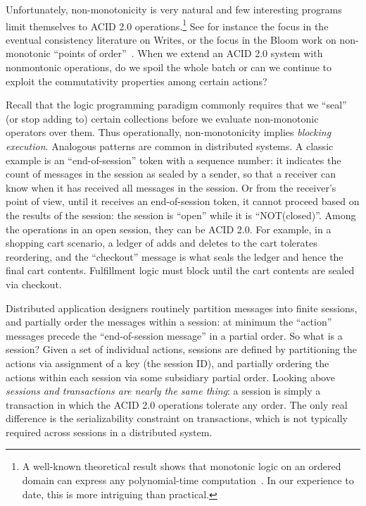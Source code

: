 \documentclass{sig-alternate}
\begin{document}
Unfortunately, non-monotonicity is very natural and few interesting programs
limit themselves to ACID 2.0 operations.\footnote{A well-known theoretical
  result shows that monotonic logic on an ordered domain can express any
  polynomial-time computation~\cite{immerman-ptime}.  In our experience to date,
  this is more intriguing than practical.}  See for instance the focus in the
eventual consistency literature on Writes, or the focus in the Bloom work on
non-monotonic ``points of order''~\cite{Alvaro2011}.  When we extend an ACID 2.0
system with nonmontonic operations, do we spoil the whole batch or can we
continue to exploit the commutativity properties among certain actions?


Recall that the logic programming paradigm commonly requires that we
``seal'' (or stop adding to) certain collections before we evaluate non-monotonic operators
over them.
Thus operationally, non-monotonicity implies \emph{blocking execution}. 
Analogous patterns are common in distributed systems.
A classic example
is an ``end-of-session'' token with a sequence number: it indicates the count of
messages in the session as sealed by a sender, so that a receiver can know when
it has received all messages in the session.  Or from the receiver's point of
view, until it receives an end-of-session token, it cannot proceed based on the
results of the session: the session is ``open'' while it is ``NOT(closed)''.
Among the operations in an open session, they can be ACID 2.0.  For example, in
a shopping cart scenario, a ledger of adds and deletes to the cart tolerates
reordering, and the ``checkout'' message is what seals the ledger and hence the
final cart contents.  Fulfillment logic must block until the cart contents are
sealed via checkout.

Distributed application designers routinely partition messages into finite
sessions, and partially order the messages within a session: at minimum the
``action'' messages precede the ``end-of-session message'' in a partial order.
So what is a session?  Given a set of individual actions, sessions are defined
by partitioning the actions via assignment of a key (the session ID), and
partially ordering the actions within each session via some subsidiary partial
order.  Looking above \emph{sessions and transactions are nearly the same
  thing}: a session is simply a transaction in which the ACID 2.0 operations
tolerate any order.  The only real difference is the serializability constraint
on transactions, which is not typically required across sessions in a
distributed system.
\end{document}
